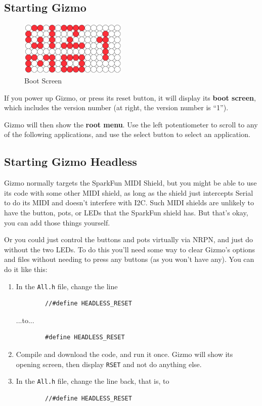 \documentclass{article}
\begin{document}
\subsection{Starting Gizmo}

\begin{figure}
\vspace{-1.5em}\includegraphics[width=2in]{Gizmo1.pdf}
\vspace{-2em}\caption{\small Boot Screen}\vspace{-2em}
\label{BootScreen}
\end{figure}

If you power up Gizmo, or press its reset button, it will display its {\bf boot screen}, which includes the version number (at right, the version number is ``1'').

Gizmo will then show the {\bf root menu}.  Use the left potentiometer to scroll to any of the following applications, and use the select button to select an application.  

\subsection{Starting Gizmo Headless}

Gizmo normally targets the SparkFun MIDI Shield, but you might be able to use its code with some other MIDI shield, as long as the shield just intercepts Serial to do its MIDI and doesn't interfere with I2C.  Such MIDI shields are unlikely to have the button, pots, or LEDs that the SparkFun shield has.  But that's okay, you can add those things yourself.  

Or you could just control the buttons and pots virtually via NRPN, and just do without the two LEDs.  To do this you'll need some way to clear Gizmo's options and files without needing to press any buttons (as you won't have any).  You can do it like this:

\begin{enumerate}
\item In the \texttt{All.h} file, change the line 
\begin{verbatim}
        //#define HEADLESS_RESET
\end{verbatim}
...to...
\begin{verbatim}
        #define HEADLESS_RESET
\end{verbatim}
\item Compile and download the code, and run it once.  Gizmo will show its opening screen, then display \texttt{RSET} and not do anything else.
\item In the \texttt{All.h} file, change the line back, that is, to 
\begin{verbatim}
        //#define HEADLESS_RESET
\end{verbatim}

\end{enumerate}
\end{document}
